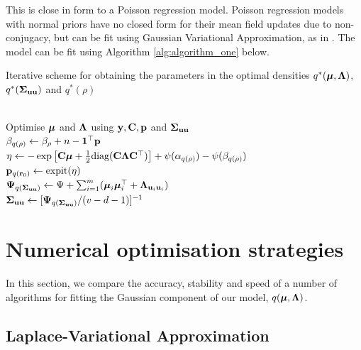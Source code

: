 \documentclass[times, doublespace]{anzsauth}
\begin{document}
\noindent This is close in form to a Poisson regression model. Poisson regression models with normal priors
have no closed form for their mean field updates due to non- conjugacy, but can be fit using Gaussian
Variational Approximation, as in \cite{ormerod09}. The model can be fit using Algorithm
\ref{alg:algorithm_one} below.

\begin{algorithm}
	\caption[Algorithm 1]{Iterative scheme for obtaining the parameters in the
		optimal densities $q^*({\boldsymbol \mu}, {\boldsymbol \Lambda})$, $q^*({\boldsymbol \Sigma}_{{\bf u} {\bf u}})$ and $q^*(\rho)$}
	\label{alg:algorithm_one}
	\begin{algorithmic}
		 \\[1ex]
		\STATE Optimise ${\boldsymbol \mu}$ and ${\boldsymbol \Lambda}$ using ${\bf y}, {\bf C}, {\bf p}$ and ${\boldsymbol \Sigma}_{{\bf u} {\bf u}}$ \\[1ex]
		\STATE $\beta_{q(\rho)} \leftarrow \beta_\rho + n - {\bf 1}^\top{\bf p}$ \\[1ex]
		\STATE $\eta \leftarrow -\exp \left [ {\bf C} {\boldsymbol \mu} + \tfrac{1}{2} \text{diag}{({\bf C}{\boldsymbol\Lambda}{\bf C}^\top)} \right ] + \psi{(\alpha_{q{(\rho)}})} - \psi{(\beta_{q{(\rho)}})}$ \\[1ex]
			\STATE ${\bf p}_{q({\bf r}_0)} \leftarrow \text{expit} (\eta)$ \\[1ex]
			\STATE ${\boldsymbol \Psi}_{q({\boldsymbol \Sigma}_{{\bf u} {\bf u}})} \leftarrow \Psi + \sum_{i=1}^m ({\boldsymbol \mu}_i {\boldsymbol \mu}_i^\top + {\boldsymbol \Lambda}_{{{\bf u}}_i {{\bf u}}_i})$ \\[1ex]
			\STATE ${\boldsymbol \Sigma}_{{\bf u}{\bf u}} \leftarrow [{\boldsymbol \Psi}_{q({\boldsymbol \Sigma}_{{\bf u} {\bf u}})}/(v - d - 1)]^{-1}$
			\ENDWHILE
		\end{algorithmic}
	\end{algorithm}
		
	\section{Numerical optimisation strategies}
	\label{sec:algorithms}
		
	In this section, we compare the accuracy, stability and speed of a number of algorithms for fitting the
	Gaussian component of our model, $q({\boldsymbol \mu}, {\boldsymbol \Lambda})$.
		
		
	\subsection{Laplace-Variational Approximation}
		
\end{document}
